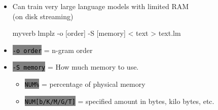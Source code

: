 \documentclass[landscape]{uedslides2C}
\newcommand{\littlecode}[1]{\colorbox{gray}{\textcolor{black}{\small \tt #1}}}
\begin{document}
\vspace{5mm}
\begin{itemize}
\item Can train very large language models with limited RAM\\
(on disk streaming)\\[5mm]
\begin{SaveVerbatim}{myverb} 
lmplz -o [order] -S [memory] < text > text.lm
\end{SaveVerbatim}
\colorbox{gray}{}

\item \littlecode{-o order} = n-gram order
\item \littlecode{-S memory} = How much memory to use.
	      \begin{itemize}
		\item \littlecode{NUM\%} = percentage of physical memory \vspace{2mm}
		\item \littlecode{NUM[b/K/M/G/T]} = specified amount in bytes, kilo bytes, etc.
	      \end{itemize}
\end{itemize}


\end{document}
